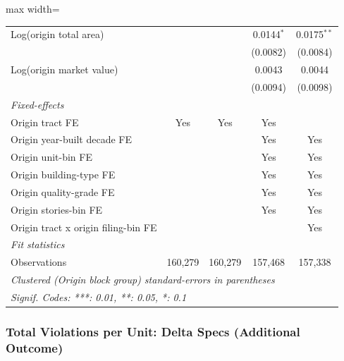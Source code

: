 \documentclass[
  11pt,
]{article}
\begin{document}
\begin{adjustbox}{max width=\textwidth}
\begin{tabular}{lcccc}
   Log(origin total area)                         &                &                & 0.0144$^{*}$   & 0.0175$^{**}$\\   
                                                  &                &                & (0.0082)       & (0.0084)\\   
   Log(origin market value)                       &                &                & 0.0043         & 0.0044\\   
                                                  &                &                & (0.0094)       & (0.0098)\\   
   \midrule
   \emph{Fixed-effects}\\
   Origin tract FE                                & Yes            & Yes            & Yes            & \\  
   Origin year-built decade FE                    &                &                & Yes            & Yes\\  
   Origin unit-bin FE                             &                &                & Yes            & Yes\\  
   Origin building-type FE                        &                &                & Yes            & Yes\\  
   Origin quality-grade FE                        &                &                & Yes            & Yes\\  
   Origin stories-bin FE                          &                &                & Yes            & Yes\\  
   Origin tract x origin filing-bin FE            &                &                &                & Yes\\  
   \midrule
   \emph{Fit statistics}\\
   Observations                                   & 160,279        & 160,279        & 157,468        & 157,338\\  
   \midrule \midrule
   \multicolumn{5}{l}{\emph{Clustered (Origin block group) standard-errors in parentheses}}\\
   \multicolumn{5}{l}{\emph{Signif. Codes: ***: 0.01, **: 0.05, *: 0.1}}\\
\end{tabular}
\par\endgroup

\end{adjustbox}

\subsubsection{Total Violations per Unit: Delta Specs (Additional
Outcome)}\label{total-violations-per-unit-delta-specs-additional-outcome}
\end{document}
